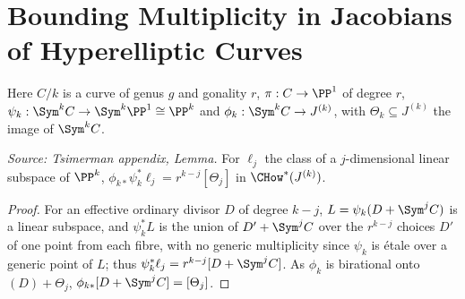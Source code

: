 \section{Bounding Multiplicity in Jacobians of Hyperelliptic Curves}

Here $C/k$ is a curve of genus $g$ and gonality $r$, $\pi:C\to\PP^1$ of degree
$r$, $\psi_k:\Sym^k C\to\Sym^k\PP^1\cong\PP^k$ and $\phi_k:\Sym^k C\to J^{(k)}$,
with $\Theta_k\subseteq J^{(k)}$ the image of $\Sym^k C$.

\begin{lemma}
  \label{lem:sawin_appendix_linear}
  \textit{Source: Tsimerman appendix, Lemma.}
  For $\ell_j$ the class of a $j$-dimensional linear subspace of $\PP^k$,
  $\phi_{k*}\psi_k^*\ell_j = r^{k-j}[\Theta_j]$ in $\CHow^*(J^{(k)})$.
\end{lemma}
\begin{proof}
  For an effective ordinary divisor $D$ of degree $k-j$, $L=\psi_k(D+\Sym^j C)$ is
  a linear subspace, and $\psi_k^*L$ is the union of $D'+\Sym^j C$ over the
  $r^{k-j}$ choices $D'$ of one point from each fibre, with no generic
  multiplicity since $\psi_k$ is étale over a generic point of $L$; thus
  $\psi_k^*\ell_j=r^{k-j}[D+\Sym^j C]$.  As $\phi_k$ is birational onto
  $(D)+\Theta_j$, $\phi_{k*}[D+\Sym^j C]=[\Theta_j]$.
\end{proof}

